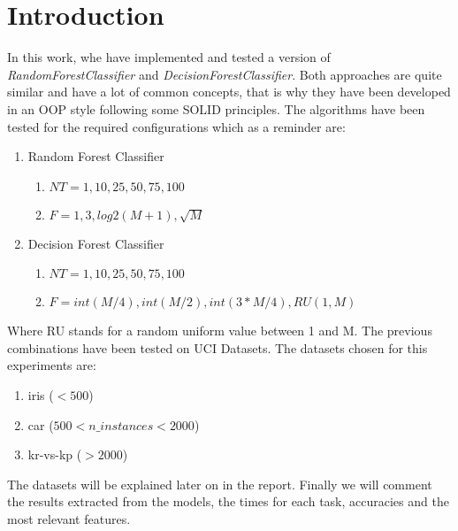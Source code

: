 \section{Introduction}

In this work, whe have implemented and tested a version of \textit{RandomForestClassifier} and \textit{DecisionForestClassifier}. Both approaches are quite similar and have a lot of common concepts, that is why they have been developed in an OOP style following some SOLID principles. The algorithms have been tested for the required configurations which as a reminder are:

\begin{enumerate}
    \item Random Forest Classifier
    \begin{enumerate}
        \item $NT = 1, 10, 25, 50, 75, 100$
        \item $F = 1, 3, log2(M+1), \sqrt{M}$
    \end{enumerate}
    \item Decision Forest Classifier
    \begin{enumerate}
        \item $NT = 1, 10, 25, 50, 75, 100$
        \item $F = int(M/4), int(M/2), int(3*M/4), RU(1, M)$
    \end{enumerate}
\end{enumerate}

Where RU stands for a random uniform value between 1 and M. The previous combinations have been tested on UCI Datasets. The datasets chosen for this experiments are:

\begin{enumerate}
    \item iris ($< 500$)
    \item car ($500 < n\_instances < 2000$)
    \item kr-vs-kp ($> 2000$)
\end{enumerate}

The datasets will be explained later on in the report. Finally we will comment the results extracted from the models, the times for each task, accuracies and the most relevant features.
